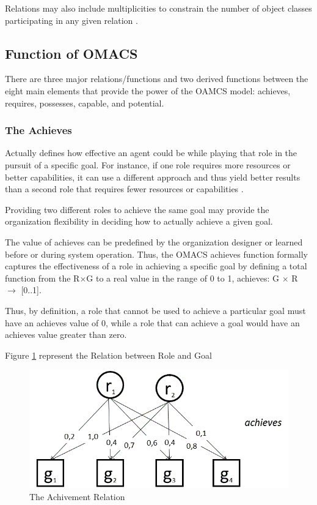 Relations may also include multiplicities to constrain the number of object classes participating in
any given relation \cite{omacs2}.
 
\subsection{Function of OMACS}

There are three major relations/functions and two derived functions between the eight main elements that provide the power of the OAMCS model: achieves, requires, possesses, capable, and potential. 
\subsubsection{The Achieves}
Actually defines how effective an agent could be while playing that role in the pursuit of a specific goal. For instance, if one role requires more resources or better capabilities, it can use a different approach and thus yield better results than a second role that requires fewer resources or capabilities \cite{omacs4}.

Providing two different roles to achieve the same goal may provide the organization flexibility in deciding how to actually achieve a given goal.

The value of achieves can be predefined by the organization designer or learned before or during system operation. Thus, the OMACS achieves function formally captures the effectiveness of a role in achieving a specific goal by defining a total function from the R$\times$G to a real value in the range of 0 to 1, achieves: G $\times$ R $\rightarrow$ {[}0..1{]}.
 
Thus, by definition, a role that cannot be used to achieve a particular goal must have an achieves value of 0, while a role that can achieve a goal would have an achieves value greater than zero\cite{omacs4}.

Figure \ref{fig:The Achivement Relation} represent the Relation between Role and Goal 
\begin{figure}[th]
	\centering
		\includegraphics[scale=0.5]{ch1/img/RelAchieve}
	\caption{\label{fig:The Achivement Relation}The Achivement Relation}
\end{figure} 
 

